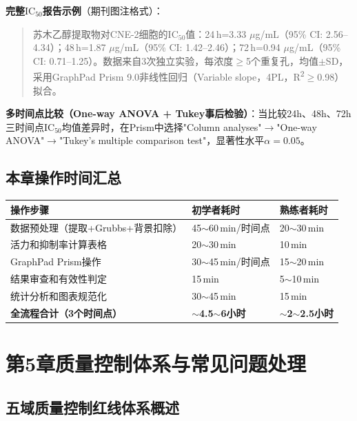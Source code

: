 \documentclass[12pt,a4paper]{article}
\newcommand{\ic}{\ensuremath{\text{IC}_{50}}}
\newcommand{\um}{\,$\mu$g/mL}
\begin{document}
\textbf{完整\ic{}报告示例}（期刊图注格式）：

\begin{quotation}
苏木乙醇提取物对CNE-2细胞的\ic{}值：24\,h=3.33\,\um{}（95\% CI: 2.56--4.34）；48\,h=1.87\,\um{}（95\% CI: 1.42--2.46）；72\,h=0.94\,\um{}（95\% CI: 0.71--1.25）。数据来自3次独立实验，每浓度$\geq$5个重复孔，均值$\pm$SD，采用GraphPad Prism 9.0非线性回归（Variable slope，4PL，R\textsuperscript{2}$\geq$0.98）拟合。
\end{quotation}

\textbf{多时间点比较（One-way ANOVA + Tukey事后检验）}：当比较24h、48h、72h三时间点\ic{}均值差异时，在Prism中选择"Column analyses"$\to$"One-way ANOVA"$\to$"Tukey's multiple comparison test"，显著性水平$\alpha=0.05$。

\subsection{本章操作时间汇总}

\begin{center}
\begin{tabular}{lll}
\toprule
\rowcolor{tabheadbg}\color{white}\textbf{操作步骤} & \color{white}\textbf{初学者耗时} & \color{white}\textbf{熟练者耗时} \\
\midrule
数据预处理（提取+Grubbs+背景扣除）& 45$\sim$60\,min/时间点 & 20$\sim$30\,min \\
活力和抑制率计算表格 & 20$\sim$30\,min & 10\,min \\
GraphPad Prism操作 & 30$\sim$45\,min/时间点 & 15$\sim$20\,min \\
结果审查和有效性判定 & 15\,min & 5$\sim$10\,min \\
统计分析和图表规范化 & 30$\sim$45\,min & 15\,min \\
\textbf{全流程合计（3个时间点）} & \textbf{$\sim$4.5$\sim$6小时} & \textbf{$\sim$2$\sim$2.5小时} \\
\bottomrule
\end{tabular}
\end{center}

\section{第5章\enspace 质量控制体系与常见问题处理}

\subsection{五域质量控制红线体系概述}
\end{document}
